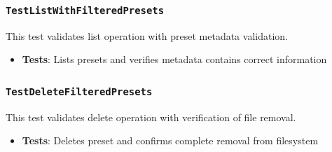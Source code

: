 \subsubsection*{\texttt{TestListWithFilteredPresets}}
This test validates list operation with preset metadata validation.
\begin{itemize}
    \item \textbf{Tests}: Lists presets and verifies metadata contains correct information
\end{itemize}

\subsubsection*{\texttt{TestDeleteFilteredPresets}}
This test validates delete operation with verification of file removal.
\begin{itemize}
    \item \textbf{Tests}: Deletes preset and confirms complete removal from filesystem
\end{itemize}
